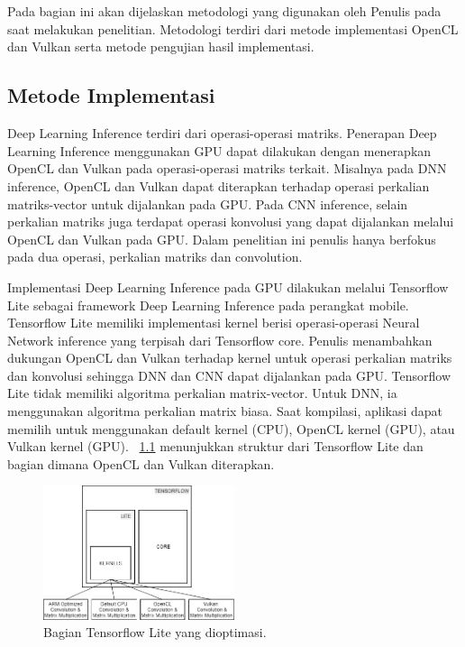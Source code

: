 \chapter{\babTiga}
Pada bagian ini akan dijelaskan metodologi yang digunakan oleh Penulis pada saat melakukan penelitian. Metodologi terdiri dari metode implementasi OpenCL dan Vulkan serta metode pengujian hasil implementasi.

\section{Metode Implementasi }
Deep Learning Inference terdiri dari operasi-operasi matriks. Penerapan Deep Learning Inference menggunakan GPU dapat dilakukan dengan menerapkan OpenCL dan Vulkan pada operasi-operasi matriks terkait. Misalnya pada DNN inference, OpenCL dan Vulkan dapat diterapkan terhadap operasi perkalian matriks-vector untuk dijalankan pada GPU. Pada CNN inference, selain perkalian matriks juga terdapat operasi konvolusi yang dapat dijalankan melalui OpenCL dan Vulkan pada GPU. Dalam penelitian ini penulis hanya berfokus pada dua operasi, perkalian matriks dan convolution.

Implementasi Deep Learning Inference pada GPU dilakukan melalui Tensorflow Lite sebagai framework Deep Learning Inference pada perangkat mobile. Tensorflow Lite memiliki implementasi kernel berisi operasi-operasi Neural Network inference yang terpisah dari Tensorflow core. Penulis menambahkan dukungan OpenCL dan Vulkan terhadap kernel untuk operasi perkalian matriks dan konvolusi sehingga DNN dan CNN dapat dijalankan pada GPU. Tensorflow Lite tidak memiliki algoritma perkalian matrix-vector. Untuk DNN, ia menggunakan algoritma perkalian matrix biasa. Saat kompilasi, aplikasi dapat memilih untuk menggunakan default kernel (CPU), OpenCL kernel (GPU), atau Vulkan kernel (GPU). \pic~\ref{fig:modifieddiagram} menunjukkan struktur dari Tensorflow Lite dan bagian dimana OpenCL dan Vulkan diterapkan.

\begin{figure}
	\centering
	\includegraphics[width=0.50\textwidth]
	{pics/modifieddiagram.png}
	\caption{Bagian Tensorflow Lite yang dioptimasi.}
	\label{fig:modifieddiagram}
\end{figure}

